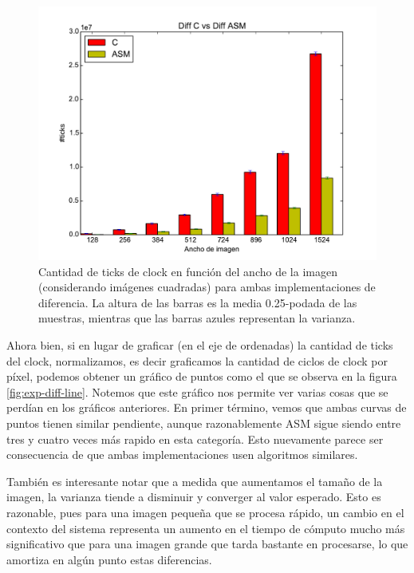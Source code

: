 \begin{figure}[H]
\begin{minipage}{0.45\textwidth}
    \includegraphics[width=1\textwidth]{../graficos/barplot_diff2} 
  \caption{\footnotesize Cantidad de ticks de clock en función del ancho de la imagen (considerando imágenes cuadradas) para ambas implementaciones de diferencia. La altura de las barras es la media 0.25-podada de las muestras, mientras que las barras azules representan la varianza.}
  \label{fig:exp-diff-bar2}
\end{minipage}%
\end{figure}

Ahora bien, si en lugar de graficar (en el eje de ordenadas) la cantidad de ticks del clock, normalizamos, es decir graficamos la cantidad de ciclos de clock por píxel, podemos obtener un gráfico de puntos como el que se observa en la figura \ref{fig:exp-diff-line}. Notemos que este gráfico nos permite ver varias cosas que se perdían en los gráficos anteriores. En primer término, vemos que ambas curvas de puntos tienen similar pendiente, aunque razonablemente ASM sigue siendo entre tres y cuatro veces más rapido en esta categoría. Esto nuevamente parece ser consecuencia de que ambas implementaciones usen algoritmos similares. 

También es interesante notar que a medida que aumentamos el tamaño de la imagen, la varianza tiende a disminuir y converger al valor esperado. Esto es razonable, pues para una imagen pequeña que se procesa rápido, un cambio en el contexto del sistema representa un aumento en el tiempo de cómputo mucho más significativo que para una imagen grande que tarda bastante en procesarse, lo que amortiza en algún punto estas diferencias.

